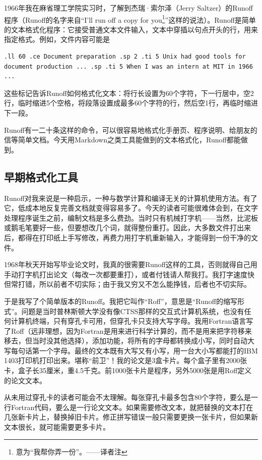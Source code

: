 \documentclass[a4paper,12pt,UTF8,twoside]{ctexbook}
\begin{document}
1966年我在麻省理工学院实习时，了解到杰瑞·索尔泽（Jerry Saltzer）的Runoff程序（Runoff的名字来自“I’ll run off a copy for you\footnote{意为“我帮你弄一份”。——译者注}”这样的说法）。Runoff是简单的文本格式化程序：它接受普通文本文件输入，文本中穿插以句点开头的行，用来指定格式。例如，文件内容可能是

\begin{lstlisting}
.ll 60 .ce Document preparation .sp 2 .ti 5 Unix had good tools for document production ... .sp .ti 5 When I was an intern at MIT in 1966 ...
\end{lstlisting}

这些标记告诉Runoff如何格式化文本：将行长设置为60个字符，下一行居中，空2行，临时缩进5个空格，将段落设置成最多60个字符的行，然后空1行，再临时缩进下一段。

Runoff有一二十条这样的命令，可以很容易地格式化手册页、程序说明、给朋友的信等简单文档。今天用Markdown之类工具能做到的文本格式化，Runoff都能做到。

\subsection{早期格式化工具}

Runoff对我来说是一种启示，一种与数学计算和编译无关的计算机使用方法。有了它，低成本地反复完善文档就变得容易多了。今天的读者可能很难体会到，在文字处理程序诞生之前，编制文档是多么费劲。当时只有机械打字机——当然，比泥板或鹅毛笔要好一些，但要想改几个词，就得整份重打。因此，大多数文件打出来后，都得在打印纸上手写修改，再费力用打字机重新输入，才能得到一份干净的文件。

1968年秋天开始写毕业论文时，我真的很需要Runoff这样的工具，否则就得自己用手动打字机打出论文（每改一次都要重打），或者付钱请人帮我打。我打字速度快但常打错，所以前者不切实际；由于我又穷又不怎么能挣钱，后者也不切实际。

于是我写了个简单版本的Runoff。我把它叫作“Roff”，意思是“Runoff的缩写形式”。问题是当时普林斯顿大学没有像CTSS那样的交互式计算机系统，也没有任何计算机终端，只有穿孔卡可用，但穿孔卡只支持大写字母。我用Fortran语言写了Roff（远非理想，因为Fortran是用来进行科学计算的，而不是用来把字符移来移去，但当时没其他选择），添加功能，将所有的字母都转换成小写，同时自动大写每句话第一个字母。最终的文本既有大写又有小写，用一台大小写都能打的IBM 1403打印机打印出来。堪称“前卫”！我的论文是3盒卡片。每个盒子里有2000张卡，盒子长35厘米，重4.5千克。前1000张卡片是程序，另外5000张是用Roff定义的论文文本。

从未用过穿孔卡的读者可能会不太理解。每张穿孔卡最多包含80个字符，要么是一行Fortran代码，要么是一行论文文本。如果需要修改文本，就把替换的文本打在几张新卡片上，替换掉旧卡片。修正拼写错误一般只需要更换一张卡片，但如果新文本很长，就可能需要更多卡片。
\end{document}
